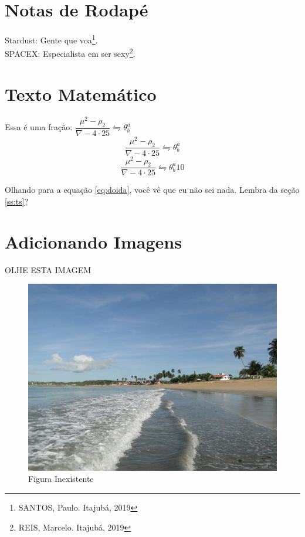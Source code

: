 \documentclass[11pt,a4paper]{article}
\begin{document}
\newpage
\section{Notas de Rodapé}

Stardust: Gente que voa\footnote{SANTOS, Paulo. Itajubá, 2019}.\\
SPACEX: Especialista em ser sexy\footnote{REIS, Marcelo. Itajubá, 2019}.

\section{Texto Matemático}

Essa é uma fração: $\dfrac{\mu^2 - \rho_2}{\nabla - 4 \cdot 25} \leftrightharpoons \theta_b^a$
$$\dfrac{\mu^2 - \rho_2}{\nabla - 4 \cdot 25} \leftrightharpoons \theta_b^a$$
\begin{equation}
\dfrac{\mu^2 - \rho_2}{\nabla - 4 \cdot 25} \leftrightharpoons \theta_b^a 10
\label{eq:doida}
\end{equation}

Olhando para a equação \eqref{eq:doida}, você vê que eu não sei nada. Lembra da seção \ref{ss:ts}?

\newpage
\section{Adicionando Imagens}

OLHE ESTA IMAGEM
\begin{figure}[!h]
\centering
\includegraphics[width=.8\textwidth]{1.jpg}
\caption{Figura Inexistente}
\end{figure}
\end{document}
